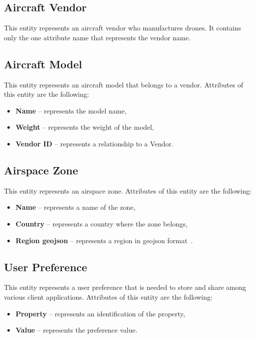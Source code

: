 \subsection{Aircraft Vendor}\label{subsec:aircraft-vendor}
This entity represents an aircraft vendor who manufactures drones.
It contains only the one attribute name that represents the vendor name.

\subsection{Aircraft Model}\label{subsec:aircraft-model}
This entity represents an aircraft model that belongs to a vendor.
Attributes of this entity are the following:
\begin{itemize}
    \item \textbf{Name} -- represents the model name,
    \item \textbf{Weight} -- represents the weight of the model,
    \item \textbf{Vendor ID} -- represents a relationship to a Vendor.
\end{itemize}

\subsection{Airspace Zone}\label{subsec:airspace-zone}
This entity represents an airspace zone.
Attributes of this entity are the following:
\begin{itemize}
    \item \textbf{Name} -- represents a name of the zone,
    \item \textbf{Country} -- represents a country where the zone belongs,
    \item \textbf{Region \acrshort{geojson}} -- represents a region in \acrshort{geojson} format~\cite{geoJson}.
\end{itemize}

\subsection{User Preference}\label{subsec:user-preference}
This entity represents a user preference that is needed to store and share among various client applications.
Attributes of this entity are the following:
\begin{itemize}
    \item \textbf{Property} -- represents an identification of the property,
    \item \textbf{Value} -- represents the preference value.
\end{itemize}

